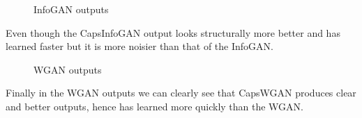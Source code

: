 \begin{figure}[H]
    \centering
    \caption{InfoGAN outputs}%
    \label{fig:infogan_gen}%
\end{figure}
Even though the CapsInfoGAN output looks structurally more better and has learned faster but it is more noisier than that of the InfoGAN.
\begin{figure}[H]
    \centering
    \qquad
    \caption{WGAN outputs}%
    \label{fig:wgan_gen}%
\end{figure}
Finally in the WGAN outputs we can clearly see that CapsWGAN produces clear and better outputs, hence has learned more quickly than the WGAN. 

